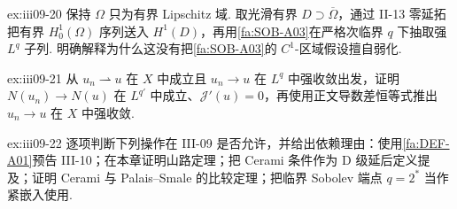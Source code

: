 \begin{FAExercise}{ex:iii09-20}
保持 \(\displaystyle\Omega\) 只为有界 Lipschitz 域. 取光滑有界 \(\displaystyle D\supset\overline\Omega\)，通过 II-13 零延拓把有界 \(\displaystyle H_0^1(\Omega)\) 序列送入 \(\displaystyle H^1(D)\)，再用\autoref{fa:SOB-A03}在严格次临界 \(\displaystyle q\) 下抽取强 \(\displaystyle L^q\) 子列. 明确解释为什么这没有把\autoref{fa:SOB-A03}的 \(\displaystyle C^1\)-区域假设擅自弱化.
\end{FAExercise}

\begin{FAExercise}{ex:iii09-21}
从 \(\displaystyle u_n\rightharpoonup u\) 在 \(\displaystyle X\) 中成立且 \(\displaystyle u_n\to u\) 在 \(\displaystyle L^q\) 中强收敛出发，证明 \(\displaystyle N(u_n)\to N(u)\) 在 \(\displaystyle L^{q'}\) 中成立、\(\displaystyle\mathcal J'(u)=0\)，再使用正文导数差恒等式推出 \(\displaystyle u_n\to u\) 在 \(\displaystyle X\) 中强收敛.
\end{FAExercise}

\begin{FAExercise}{ex:iii09-22}
逐项判断下列操作在 III-09 是否允许，并给出依赖理由：使用\autoref{fa:DEF-A01}预告 III-10；在本章证明山路定理；把 Cerami 条件作为 D 级延后定义提及；证明 Cerami 与 Palais--Smale 的比较定理；把临界 Sobolev 端点 \(\displaystyle q=2^*\) 当作紧嵌入使用.
\end{FAExercise}